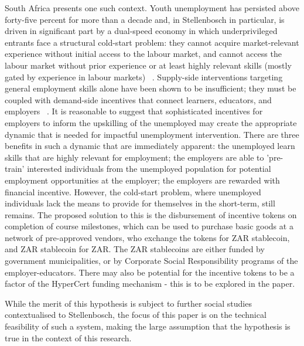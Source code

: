 \documentclass[conference]{IEEEtran}
\begin{document}
South Africa presents one such context. Youth unemployment has persisted above forty-five percent for more than a decade and, in Stellenbosch in particular, is driven in significant part by a dual-speed economy in which underprivileged entrants face a structural cold-start problem: they cannot acquire market-relevant experience without initial access to the labour market, and cannot access the labour market without prior experience or at least highly relevant skills (mostly gated by experience in labour markets) ~\cite{bhorat2016youth,graham2015youth,francis2019inequality}.
Supply-side interventions targeting general employment skills alone have been shown to be insufficient; they must be coupled with demand-side incentives that connect learners, educators, and employers ~\cite{mckenzie2017almp,bhorat2016youth}. It is reasonable to suggest that sophisticated incentives for employers to inform the upskilling of the unemployed may create the appropriate dynamic that is needed for impactful unemployment intervention. There are three benefits in such a dynamic that are immediately apparent: the unemployed learn skills that are highly relevant for employment; the employers are able to 'pre-train' interested individuals from the unemployed population for potential employment opportunities at the employer; the employers are rewarded with financial incentive. However, the cold-start problem, where unemployed individuals lack the means to provide for themselves in the short-term, still remains. The proposed solution to this is the disbursement of incentive tokens on completion of course milestones, which can be used to purchase basic goods at a network of pre-approved vendors, who exchange the tokens for ZAR stablecoin, and ZAR stablecoin for ZAR. The ZAR stablecoins are either funded by government municipalities, or by Corporate Social Responsibility programs of the employer-educators. There may also be potential for the incentive tokens to be a factor of the HyperCert funding mechanism - this is to be explored in the paper.

While the merit of this hypothesis is subject to further social studies contextualised to Stellenbosch, the focus of this paper is on the technical feasibility of such a system, making the large assumption that the hypothesis is true in the context of this research.
\end{document}
